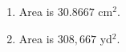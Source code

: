 {\begin{minipage}{\linewidth}\end{minipage}}
{\begin{enumerate}
\item		Area is $30.8667$ cm$^2$.
\item		Area is $308,667$ yd$^2$.
\end{enumerate}
}
